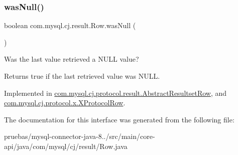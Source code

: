 \mbox{\label{interfacecom_1_1mysql_1_1cj_1_1result_1_1_row_a6a915f3dfaf8f9997f705b7762f9c6cb}} 
\subsubsection{\texorpdfstring{was\+Null()}{wasNull()}}
{\footnotesize\ttfamily boolean com.\+mysql.\+cj.\+result.\+Row.\+was\+Null (\begin{DoxyParamCaption}{ }\end{DoxyParamCaption})}

Was the last value retrieved a N\+U\+LL value?

\begin{DoxyReturn}{Returns}
true if the last retrieved value was N\+U\+LL. 
\end{DoxyReturn}


Implemented in \mbox{\hyperlink{classcom_1_1mysql_1_1cj_1_1protocol_1_1result_1_1_abstract_resultset_row_a9d1a54529c6a83e356e4d6bf079f8548}{com.\+mysql.\+cj.\+protocol.\+result.\+Abstract\+Resultset\+Row}}, and \mbox{\hyperlink{classcom_1_1mysql_1_1cj_1_1protocol_1_1x_1_1_x_protocol_row_ae6fd328d9a5ac92bdbb910fb9c8c043a}{com.\+mysql.\+cj.\+protocol.\+x.\+X\+Protocol\+Row}}.



The documentation for this interface was generated from the following file\+:\begin{DoxyCompactItemize}
\item 
pruebas/mysql-\/connector-\/java-\/8../src/main/core-\/api/java/com/mysql/cj/result/Row.\+java\end{DoxyCompactItemize}
